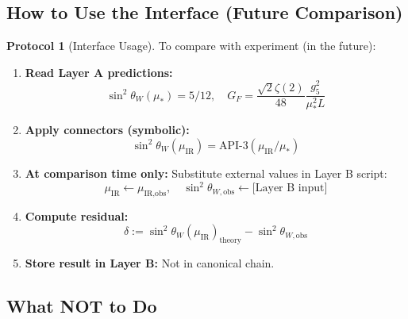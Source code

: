 \documentclass[11pt,a4paper]{article}
\theoremstyle{definition}
\newtheorem{protocol}{Protocol}[section]
\begin{document}
\subsection{How to Use the Interface (Future Comparison)}
\label{subsec:how_to_use}

\begin{protocol}[Interface Usage]
\label{prot:usage}
To compare with experiment (in the future):
\begin{enumerate}
\item \textbf{Read Layer A predictions:}
\begin{equation}
\label{eq:read_layer_a}
\sin^2\theta_W(\mu_*) = 5/12, \quad G_F = \frac{\sqrt{2}\zeta(2)}{48}\frac{g_5^2}{\mu_*^2 L}
\end{equation}
\item \textbf{Apply connectors (symbolic):}
\begin{equation}
\label{eq:apply_connector}
\sin^2\theta_W(\mu_{\text{IR}}) = \text{API-3}(\mu_{\text{IR}}/\mu_*)
\end{equation}
\item \textbf{At comparison time only:} Substitute external values in Layer B script:
\begin{equation}
\label{eq:substitute_external}
\mu_{\text{IR}} \leftarrow \mu_{\text{IR,obs}}, \quad \sin^2\theta_{W,\text{obs}} \leftarrow \text{[Layer B input]}
\end{equation}
\item \textbf{Compute residual:}
\begin{equation}
\label{eq:residual}
\delta := \sin^2\theta_W(\mu_{\text{IR}})_{\text{theory}} - \sin^2\theta_{W,\text{obs}}
\end{equation}
\item \textbf{Store result in Layer B:} Not in canonical chain.
\end{enumerate}
\end{protocol}

\subsection{What NOT to Do}
\label{subsec:what_not_to_do}
\end{document}
